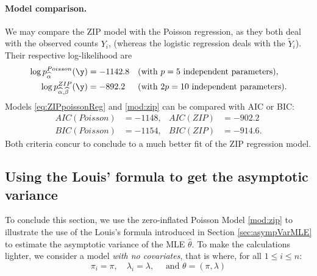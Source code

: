 \paragraph{Model comparison.}
We may compare the ZIP model with the Poisson regression, as they both deal with the observed counts $Y_i$, (whereas the logistic regression deals with the $\widetilde{Y}_i$). Their respective log-likelihood are
\begin{align*}
  \log p_{\widehat{\alpha}}^{Poisson}(\y) & = -1142.8 & & (\text{with $p=5$ independent parameters}), \\
  \log p_{\widehat{\alpha}, \widehat{\beta}}^{ZIP}(\y) & = -892.2 & & (\text{with $2 p=10$ independent parameters}).  
\end{align*}
Models \eqref{eq:ZIPpoissonReg} and \eqref{mod:zip} can be compared with AIC or BIC:
\begin{align*}
  AIC(Poisson) & = -1148, & AIC(ZIP) & = -902.2 \\
  BIC(Poisson) & = -1154, & BIC(ZIP) & = -914.6. 
\end{align*}
Both criteria concur to conclude to a much better fit of the ZIP regression model.
\subsection{Using the Louis' formula to get the asymptotic variance}\label{sec:AsympVarZIP}
To conclude this section, we use the zero-inflated Poisson Model \ref{mod:zip} to illustrate the use of the Louis's formula \citep{Louis82} introduced in Section \ref{sec:asympVarMLE} to estimate the asymptotic variance of the MLE $\widehat{\theta}$. 
To make the calculations lighter, we consider a model \emph{with no covariates}, that is where, for all $1 \leq i \leq n$: $$\pi_i = \pi, \quad \lambda_i = \lambda, \quad \mbox{ and } \theta = (\pi, \lambda)$$





